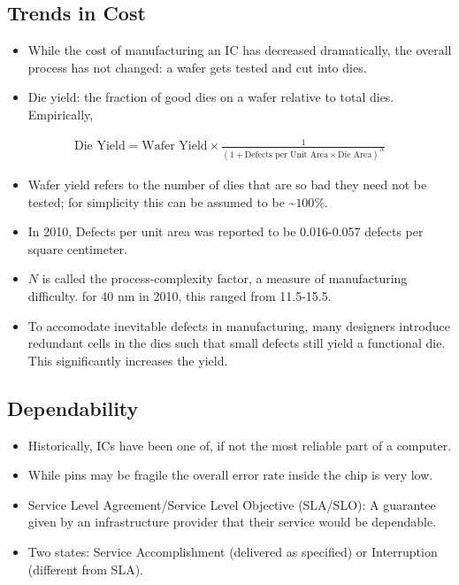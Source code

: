 \documentclass[11pt, a4paper]{article}
\theoremstyle{definition}
\theoremstyle{remark}
\begin{document}
\subsection{Trends in Cost}
\begin{itemize}
    \item While the cost of manufacturing an IC has decreased dramatically, the overall process has not changed: a wafer gets tested and cut into dies. 
    \item Die yield: the fraction of good dies on a wafer relative to total dies. Empirically,
\end{itemize}
\begin{align*}
    \text{Die Yield} = \text{Wafer Yield} \times \frac{1}{(1+\text{Defects per Unit Area} \times \text{Die Area})^N}
\end{align*}
\begin{itemize}
    \item Wafer yield refers to the number of dies that are so bad they need not be tested; for simplicity this can be assumed to be \textasciitilde$100\%$.
    \item In 2010, Defects per unit area was reported to be 0.016-0.057 defects per square centimeter.
    \item $N$ is called the process-complexity factor, a measure of manufacturing difficulty. for 40 nm in 2010, this ranged from 11.5-15.5.
    \item To accomodate inevitable defects in manufacturing, many designers introduce redundant cells in the dies such that small defects still yield a functional die. This significantly increases the yield.
\end{itemize}
\subsection{Dependability}
\begin{itemize}
    \item Historically, ICs have been one of, if not the most reliable part of a computer. 
    \item While pins may be fragile the overall error rate inside the chip is very low.
    \item Service Level Agreement/Service Level Objective (SLA/SLO): A guarantee given by an infrastructure provider that their service would be dependable. 
    \item Two states: Service Accomplishment (delivered as specified) or Interruption (different from SLA). 
\end{itemize}
\end{document}
